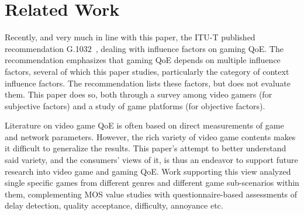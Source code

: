 \section{Related Work}
\label{sec:relatedwork}

Recently, and very much in line with this paper, the \acrshort{ITU-T}
published recommendation G.1032~\cite{mollertowards, itutg1032}, dealing with
influence factors on gaming \gls{QoE}.
The recommendation emphasizes that gaming \gls{QoE} depends on multiple
influence factors, several of which this paper studies,
particularly the category of context influence factors.
The recommendation lists these factors,
but does not evaluate them. This paper does so, both through a survey
among video gamers (for subjective factors) and a study of
game platforms (for objective factors).

Literature on video game \gls{QoE} is often based on
direct measurements of game and network parameters. However, the
rich variety of video game contents makes it difficult to generalize
the results. This paper's attempt to better understand said variety,
and the consumers' views of it, is thus an endeavor to support future
research into video game and gaming \gls{QoE}.
Work supporting this view \cite{7965676,7503835} analyzed single specific
games from different genres and different game sub-scenarios within
them, complementing \acrshort{MOS} value studies with questionnaire-based
assessments of delay detection, quality acceptance, difficulty,
annoyance etc.

